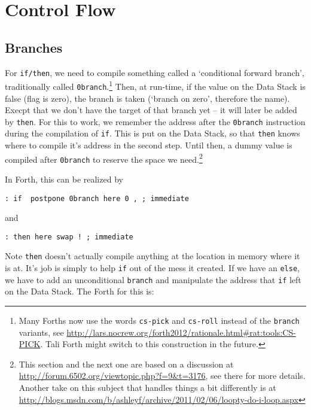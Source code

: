 \section{Control Flow} 

\subsection{Branches} 

For \texttt{if/then}, we need to compile something called a `conditional forward
branch', traditionally called \texttt{0branch}.\footnote{Many Forths now use the
words \texttt{cs-pick} and \texttt{cs-roll} instead of the \texttt{branch}
variants, see
\href{http://lars.nocrew.org/forth2012/rationale.html\#rat:tools:CS-PICK}
{http://lars.nocrew.org/forth2012/rationale.html\#rat:tools:CS-PICK}. Tali Forth
might switch to this construction in the future.} Then, at run-time, if the
value on the Data Stack is false (flag is zero), the branch is taken (`branch on
zero', therefore the name). Execpt that we don't have the target of that branch
yet -- it will later be added by \texttt{then}. For this to work, we remember
the address after the \texttt{0branch} instruction during the compilation of
\texttt{if}. This is put on the Data Stack, so that \texttt{then} knows where to
compile it's address in the second step. Until then, a dummy value is compiled
after \texttt{0branch} to reserve the space we need.\footnote{This section and
the next one are based on a discussion at
\href{http://forum.6502.org/viewtopic.php?f=9\&t=3176}
{http://forum.6502.org/viewtopic.php?f=9\&t=3176}, see there for more details.
Another take on this subject that handles things a bit differently is at
\href{http://blogs.msdn.com/b/ashleyf/archive/2011/02/06/loopty-do-i-loop.aspx}{http://blogs.msdn.com/b/ashleyf/archive/2011/02/06/loopty-do-i-loop.aspx}
}

In Forth, this can be realized by

\begin{lstlisting}[frame=single]
        : if  postpone 0branch here 0 , ; immediate
\end{lstlisting}

and 

\begin{lstlisting}[frame=single]
        : then here swap ! ; immediate
\end{lstlisting}

Note \texttt{then} doesn't actually compile anything at the location in memory
where it is at. It's job is simply to help \texttt{if} out of the mess it
created.  If we have an \texttt{else}, we have to add an unconditional
\texttt{branch} and manipulate the address that \texttt{if} left on the Data
Stack. The Forth for this is: 

